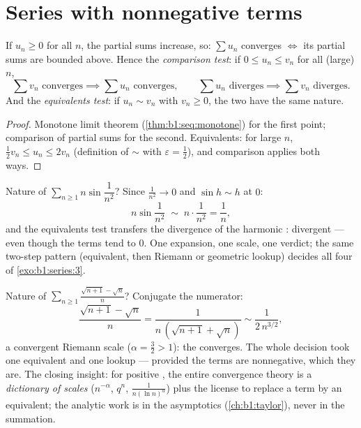 \section{Series with nonnegative terms}

\begin{theorem}\label{thm:b1:series:positive}
If $u_n \geq 0$ for all $n$, the partial sums increase, so: $\sum
u_n$ converges $\iff$ its partial sums are bounded above. Hence the
\emph{comparison test}: if $0 \leq u_n \leq v_n$ for all (large)
$n$,
\[
\sum v_n \text{ converges} \implies \sum u_n \text{ converges},
\qquad
\sum u_n \text{ diverges} \implies \sum v_n \text{ diverges}.
\]
And the \emph{equivalents test}: if $u_n \sim v_n$ with $v_n \geq
0$, the two  have the same nature.
\end{theorem}

\begin{proof}
Monotone limit theorem (\cref{thm:b1:seq:monotone}) for the first
point; comparison of partial sums for the second. Equivalents: for
large $n$, $\frac12 v_n \leq u_n \leq 2 v_n$ (definition of $\sim$
with $\varepsilon = \frac12$), and comparison applies both ways.
\end{proof}

\begin{example}\label{ex:b1:series:equivdiverge}
Nature of $\sum_{n\geq1} n\sin\dfrac{1}{n^2}$? Since
$\frac{1}{n^2} \to 0$ and $\sin h \sim h$ at $0$:
\[
n\sin\frac{1}{n^2} \;\sim\; n\cdot\frac{1}{n^2} = \frac1n ,
\]
and the equivalents test transfers the divergence of the
harmonic : divergent --- even though the terms tend to
$0$. One expansion, one scale, one verdict; the same two-step
pattern (equivalent, then Riemann or geometric lookup) decides
all four  of \cref{exo:b1:series:3}.
\end{example}

\begin{example}\label{ex:b1:series:equivtest}
Nature of $\sum_{n \geq 1} \frac{\sqrt{n+1} - \sqrt n}{n}$?
Conjugate the numerator:
\[
\frac{\sqrt{n+1} - \sqrt n}{n}
= \frac{1}{n\,(\sqrt{n+1} + \sqrt n)}
\sim \frac{1}{2\,n^{3/2}} ,
\]
a convergent Riemann scale ($\alpha = \frac32 > 1$): the 
converges. The whole decision took one equivalent and one lookup
--- provided the terms are nonnegative, which they are. The
closing insight: for positive , the entire convergence
theory is a \emph{dictionary of scales} ($n^{-\alpha}$, $q^n$,
$\frac{1}{n(\ln n)^\alpha}$) plus the license to replace a term
by an equivalent; the analytic work is in the asymptotics
(\cref{ch:b1:taylor}), never in the summation.
\end{example}

